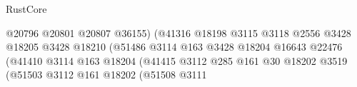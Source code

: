 \begin{lexlean}{RustCore}
\begin{coremodule}
                                                              @20796
                                                              @20801
                                                              @20807
                                                              @36155)
                                                            (@41316
                                                              @18198
                                                              @3115
                                                              @3118
                                                              @2556
                                                              @3428
                                                              @18205
                                                              @3428
                                                              @18210
                                                              (@51486
                                                                @3114
                                                                @163
                                                                @3428
                                                                @18204
                                                                @16643
                                                                @22476
                                                                (@41410
                                                                  @3114
                                                                  @163
                                                                  @18204
                                                                  (@41415
                                                                    @3112
                                                                    @285
                                                                    @161
                                                                    @30
                                                                    @18202
                                                                    @3519
                                                                    (@51503
                                                                      @3112
                                                                      @161
                                                                      @18202
                                                                      (@51508
                                                                        @3111

\end{coremodule}
\end{lexlean}
